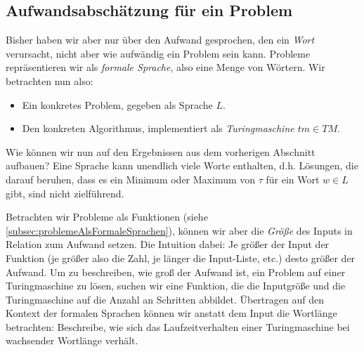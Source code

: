 \subsection{Aufwandsabschätzung für ein Problem}

Bisher haben wir aber nur über den Aufwand gesprochen,
den ein \emph{Wort} verursacht,
nicht aber wie aufwändig ein Problem sein kann.
Probleme repräsentieren wir als \emph{formale Sprache},
also eine Menge von Wörtern.
Wir betrachten nun also:
\begin{itemize}
    \item Ein konkretes Problem, gegeben als Sprache $L$.
    \item Den konkreten Algorithmus,
        implementiert als \emph{Turingmaschine $tm \in TM$}.
\end{itemize}

Wie können wir nun auf den Ergebnissen aus dem vorherigen Abschnitt aufbauen?
Eine Sprache kann unendlich viele Worte enthalten,
d.h. Lösungen, die darauf beruhen,
dass es ein Minimum oder Maximum von $\tau$ für ein Wort $w \in L$ gibt,
sind nicht zielführend.

Betrachten wir Probleme als Funktionen (siehe \autoref{subsec:problemeAlsFormaleSprachen}),
können wir aber die \emph{Größe} des Inputs in Relation zum Aufwand setzen.
Die Intuition dabei:
Je größer der Input der Funktion (je größer also die Zahl,
je länger die Input-Liste, etc.)
desto größer der Aufwand.
Um zu beschreiben,
wie groß der Aufwand ist,
ein Problem auf einer Turingmaschine zu lösen,
suchen wir eine Funktion,
die die Inputgröße und die Turingmaschine auf die Anzahl an Schritten abbildet.
Übertragen auf den Kontext der formalen Sprachen
können wir anstatt dem Input die Wortlänge betrachten:
Beschreibe, wie sich das Laufzeitverhalten einer Turingmaschine 
bei wachsender Wortlänge verhält.

